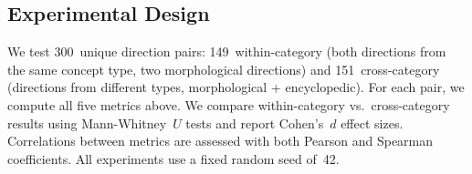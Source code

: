 \subsection{Experimental Design}
\label{sec:design}

We test 300~unique direction pairs: 149~within-category (both directions from the same concept type, \eg two morphological directions) and 151~cross-category (directions from different types, \eg morphological + encyclopedic).
For each pair, we compute all five metrics above.
We compare within-category vs.\ cross-category results using Mann-Whitney~$U$ tests and report Cohen's~$d$ effect sizes.
Correlations between metrics are assessed with both Pearson and Spearman coefficients.
All experiments use a fixed random seed of~42.
